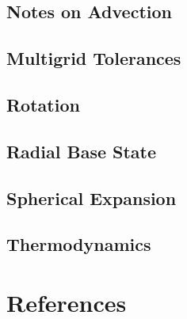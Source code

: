 \documentclass[11pt]{book}
\begin{document}
\chapter{Notes on Advection}


\chapter{Multigrid Tolerances}


\chapter{Rotation}


\chapter{Radial Base State}


\chapter{Spherical Expansion}


\chapter{Thermodynamics}


\backmatter

\part{References}

\renewcommand\bibname{References}


\end{document}
